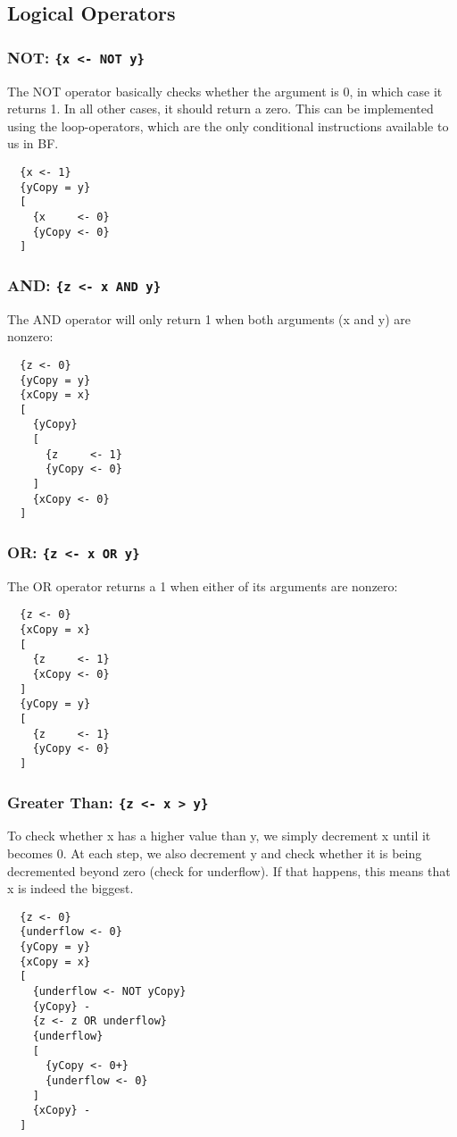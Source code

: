 \subsection{Logical Operators}
\subsubsection{NOT: \texttt{\{x <- NOT y\}}}
The NOT operator basically checks whether the argument is 0, in which case it returns 1. In all other cases, it should return a zero. This can be implemented using the loop-operators, which are the only conditional instructions available to us in BF.
\begin{lstlisting}
  {x <- 1}
  {yCopy = y}
  [
    {x     <- 0}
    {yCopy <- 0}
  ]
\end{lstlisting}

\subsubsection{AND: \texttt{\{z <- x AND y\}}}
The AND operator will only return 1 when both arguments (x and y) are nonzero:
\begin{lstlisting}
  {z <- 0}
  {yCopy = y}
  {xCopy = x}
  [
    {yCopy}
    [
      {z     <- 1}
      {yCopy <- 0}
    ]
    {xCopy <- 0}
  ]
\end{lstlisting}

\subsubsection{OR: \texttt{\{z <- x OR y\}}}
The OR operator returns a 1 when either of its arguments are nonzero:
\begin{lstlisting}
  {z <- 0}
  {xCopy = x}
  [
    {z     <- 1}
    {xCopy <- 0}
  ]
  {yCopy = y}
  [
    {z     <- 1}
    {yCopy <- 0}
  ]
\end{lstlisting}

\subsubsection{Greater Than: \texttt{\{z <- x > y\}}}
To check whether x has a higher value than y, we simply decrement x until it becomes 0. At each step, we also decrement y and check whether it is being decremented beyond zero (check for underflow). If that happens, this means that x is indeed the biggest.
\begin{lstlisting}
  {z <- 0}
  {underflow <- 0}
  {yCopy = y}
  {xCopy = x}
  [
    {underflow <- NOT yCopy}
    {yCopy} -
    {z <- z OR underflow}
    {underflow}
    [
      {yCopy <- 0+}
      {underflow <- 0}
    ]
    {xCopy} -
  ]
\end{lstlisting}

